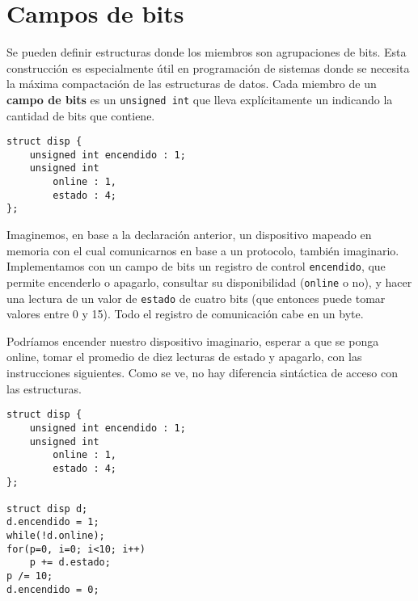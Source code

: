 \section{Campos de bits}
Se pueden definir estructuras donde los miembros son agrupaciones de bits. Esta
construcción es especialmente útil en programación de sistemas donde se
necesita la máxima compactación de las estructuras de datos. Cada miembro de un
\textbf{campo de bits} es un \lstinline{unsigned int} que lleva explícitamente un  indicando
la cantidad de bits que contiene.
\begin{lstlisting}
struct disp {
    unsigned int encendido : 1;
    unsigned int
        online : 1,
        estado : 4;
};
\end{lstlisting}
\begin{ejemplo}
Imaginemos, en base a la declaración anterior, un dispositivo mapeado en memoria con el cual
comunicarnos en base a un protocolo, también imaginario. Implementamos con un
campo de bits un registro de control \lstinline{encendido}, que permite encenderlo o apagarlo,
consultar su disponibilidad (\lstinline{online} o no), y hacer una lectura de un valor
de \lstinline{estado} de cuatro bits (que entonces puede tomar valores entre 0 y 15). Todo
el registro de comunicación cabe en un byte.

Podríamos encender nuestro dispositivo imaginario, esperar a que se ponga
online, tomar el promedio de diez lecturas de estado y apagarlo, con las
instrucciones siguientes. Como se ve, no hay diferencia sintáctica de acceso con las
estructuras.
\begin{lstlisting}
struct disp {
    unsigned int encendido : 1;
    unsigned int
        online : 1,
        estado : 4;
};

struct disp d;
d.encendido = 1;
while(!d.online);
for(p=0, i=0; i<10; i++)
    p += d.estado;
p /= 10;
d.encendido = 0;
\end{lstlisting}
\end{ejemplo}


